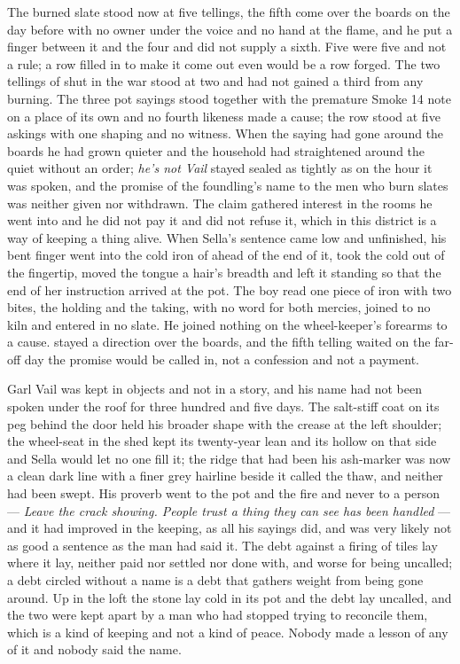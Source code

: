 The burned slate stood now at five tellings, the fifth come over the boards on the day before with no owner under the voice and no hand at the flame, and he put a finger between it and the four and did not supply a sixth. Five were five and not a rule; a row filled in to make it come out even would be a row forged. The two tellings of  shut in the war stood at two and had not gained a third from any burning. The three pot sayings stood together with the premature Smoke 14 note on a place of its own and no fourth likeness made a cause; the row stood at five askings with one shaping and no witness. When the saying had gone around the boards he had grown quieter and the household had straightened around the quiet without an order; \emph{he's not Vail} stayed sealed as tightly as on the hour it was spoken, and the promise of the foundling's name to the men who burn slates was neither given nor withdrawn. The claim gathered interest in the rooms he went into and he did not pay it and did not refuse it, which in this district is a way of keeping a thing alive. When Sella's sentence came low and unfinished, his bent finger went into the cold iron of  ahead of the end of it, took the cold out of the fingertip, moved the tongue a hair's breadth and left it standing so that the end of her instruction arrived at the pot. The boy read one piece of iron with two bites, the holding and the taking, with no  word for both mercies, joined to no kiln and entered in no slate. He joined nothing on the wheel-keeper's forearms to a cause.  stayed a direction over the boards, and the fifth telling waited on the far-off day the promise would be called in, not a confession and not a payment.

Garl Vail was kept in objects and not in a story, and his name had not been spoken under the roof for three hundred and five days. The salt-stiff coat on its peg behind the door held his broader shape with the crease at the left shoulder; the wheel-seat in the shed kept its twenty-year lean and its hollow on that side and Sella would let no one fill it; the ridge that had been his ash-marker was now a clean dark line with a finer grey hairline beside it called the thaw, and neither had been swept. His proverb went to the pot and the fire and never to a person --- \emph{Leave the crack showing. People trust a thing they can see has been handled} --- and it had improved in the keeping, as all his sayings did, and was very likely not as good a sentence as the man had said it. The debt against a firing of tiles lay where it lay, neither paid nor settled nor done with, and worse for being uncalled; a debt circled without a name is a debt that gathers weight from being gone around. Up in the loft the stone lay cold in its pot and the debt lay uncalled, and the two were kept apart by a man who had stopped trying to reconcile them, which is a kind of keeping and not a kind of peace. Nobody made a lesson of any of it and nobody said the name.

